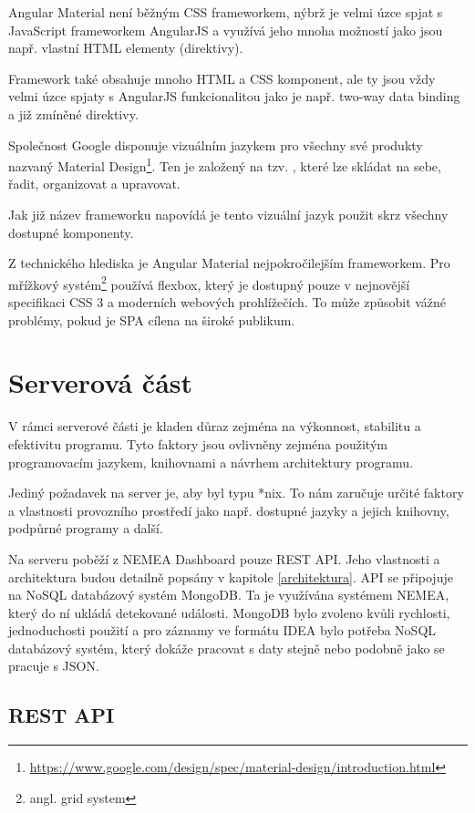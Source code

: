 Angular Material není běžným CSS frameworkem, nýbrž je velmi úzce spjat s JavaScript frameworkem AngularJS a využívá jeho mnoha možností jako jsou např. vlastní HTML elementy (direktivy).

Framework také obsahuje mnoho HTML a CSS komponent, ale ty jsou vždy velmi úzce spjaty s AngularJS funkcionalitou jako je např. two-way data binding a již zmíněné direktivy. 

Společnost Google disponuje vizuálním jazykem pro všechny své produkty nazvaný Material Design\footnote{\url{https://www.google.com/design/spec/material-design/introduction.html}}. Ten je založený na tzv. , které lze skládat na sebe, řadit, organizovat a upravovat.

Jak již název frameworku napovídá je tento vizuální jazyk použit skrz všechny dostupné komponenty.

Z technického hlediska je Angular Material nejpokročilejším frameworkem. Pro mřížkový systém\footnote{angl. grid system} používá flexbox\cite{flexbox}, který je dostupný pouze v nejnovější specifikaci CSS 3 a moderních webových prohlížečích. To může způsobit vážné problémy, pokud je SPA cílena na široké publikum.


\section{Serverová část}

V rámci serverové části je kladen důraz zejména na výkonnost, stabilitu a efektivitu programu. Tyto faktory jsou ovlivněny zejména použitým programovacím jazykem, knihovnami a návrhem architektury programu.

Jediný požadavek na server je, aby byl typu *nix. To nám zaručuje určité faktory a vlastnosti provozního prostředí jako např. dostupné jazyky a jejich knihovny, podpůrné programy a další.

Na serveru poběží z NEMEA Dashboard pouze REST API\cite{rest}. Jeho vlastnosti a architektura budou detailně popsány v kapitole \ref{architektura}. API se připojuje na NoSQL databázový systém MongoDB. Ta je využívána systémem NEMEA, který do ní ukládá detekované události. MongoDB bylo zvoleno kvůli rychlosti, jednoduchosti použití a pro záznamy ve formátu IDEA bylo potřeba NoSQL databázový systém, který dokáže pracovat s daty stejně nebo podobně jako se pracuje s JSON.

\subsection{REST API}

